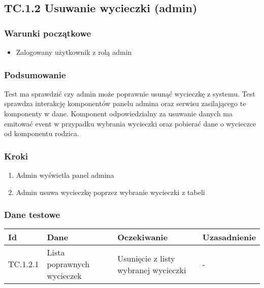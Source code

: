 \documentclass[a4paper,15pt]{article}
\begin{document}
\newpage
\begin{framed}
\subsection{TC.1.2 Usuwanie wycieczki (admin)}

\vspace{0.5cm}

\subsubsection{Warunki początkowe}
\begin{itemize}
\item Zalogowany użytkownik z rolą admin
\end{itemize}

\subsubsection{Podsumowanie}
Test ma sprawdzić czy admin może poprawnie usunąć wycieczkę z systemu. Test sprawdza interakcję komponentów panelu admina oraz serwisu zasilającego te komponenty w dane. Komponent odpowiedzialny za usuwanie danych ma emitować event w przypadku wybrania wycieczki oraz pobierać dane o wycieczce od komponentu rodzica.  

\subsubsection{Kroki}
\begin{enumerate}
\item Admin wyświetla panel admina
\item Admin usuwa wycieczkę poprzez wybranie wycieczki z tabeli
\end{enumerate}

\subsubsection{Dane testowe}

\begin{center}
\begin{tabular}{ |C{1.5cm}|C{3cm}|C{4cm}|C{4cm}| } 
 \hline
 \textbf{Id} & \textbf{Dane} & \textbf{Oczekiwanie} & \textbf{Uzasadnienie} \\ \hline
 TC.1.2.1 & Lista poprawnych wycieczek & Usunięcie z listy wybranej wycieczki & - \\ \hline
\end{tabular}
\end{center}






\newpage
\end{framed}
\end{document}
